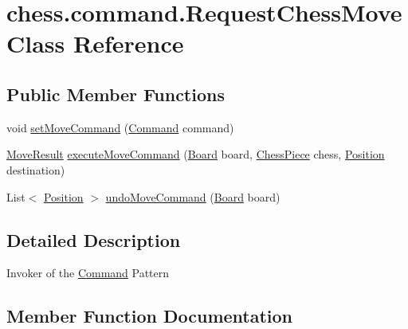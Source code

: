 \hypertarget{classchess_1_1command_1_1_request_chess_move}{}\section{chess.\+command.\+Request\+Chess\+Move Class Reference}
\label{classchess_1_1command_1_1_request_chess_move}
\subsection*{Public Member Functions}
\begin{DoxyCompactItemize}
\item 
void \mbox{\hyperlink{classchess_1_1command_1_1_request_chess_move_a0c629dc3ed07c759b2345a713e836ad2}{set\+Move\+Command}} (\mbox{\hyperlink{interfacechess_1_1command_1_1_command}{Command}} command)
\item 
\mbox{\hyperlink{enumchess_1_1models_1_1enums_1_1_move_result}{Move\+Result}} \mbox{\hyperlink{classchess_1_1command_1_1_request_chess_move_ac8cda865cf4d3681717a37e0d74493a3}{execute\+Move\+Command}} (\mbox{\hyperlink{classchess_1_1models_1_1_board}{Board}} board, \mbox{\hyperlink{classchess_1_1models_1_1_chess_piece}{Chess\+Piece}} chess, \mbox{\hyperlink{classchess_1_1models_1_1_position}{Position}} destination)
\item 
List$<$ \mbox{\hyperlink{classchess_1_1models_1_1_position}{Position}} $>$ \mbox{\hyperlink{classchess_1_1command_1_1_request_chess_move_a24e98a1984e9e806b6e96c35ba11b40a}{undo\+Move\+Command}} (\mbox{\hyperlink{classchess_1_1models_1_1_board}{Board}} board)
\end{DoxyCompactItemize}


\subsection{Detailed Description}
Invoker of the \mbox{\hyperlink{interfacechess_1_1command_1_1_command}{Command}} Pattern 

\subsection{Member Function Documentation}
\mbox{\label{classchess_1_1command_1_1_request_chess_move_ac8cda865cf4d3681717a37e0d74493a3}} 
